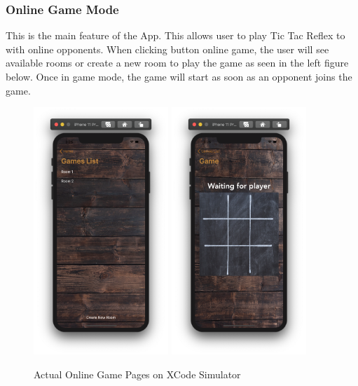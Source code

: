 \documentclass{article}
\begin{document}
    \subsubsection{Online Game Mode}
    This is the main feature of the App.  This allows user to play Tic Tac Reflex to with  online opponents.  When clicking button online game, the user will see available rooms or create a new room to play the game as seen in the left figure below.  Once in game mode, the game will start as soon as an opponent joins the game.
            \begin{figure}[h]
            \centering
            \includegraphics[width=2in]{images/sim_room.png}
            \includegraphics[width=2in]{images/sim_on.png}
        \caption{Actual Online Game Pages on XCode Simulator}
        \end{figure}  
        \newpage
\end{document}
